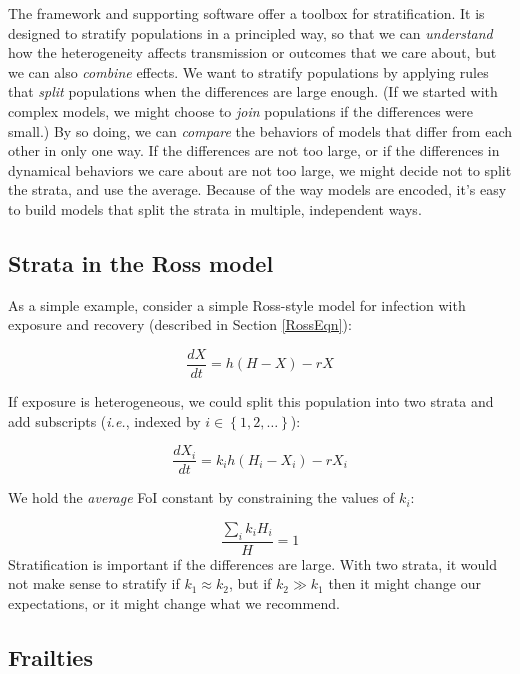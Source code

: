 \documentclass[
]{book}
\begin{document}
The framework and supporting software offer a toolbox for stratification. It is designed to stratify populations in a principled way, so that we can \emph{understand} how the heterogeneity affects transmission or outcomes that we care about, but we can also \emph{combine} effects. We want to stratify populations by applying rules that \emph{split} populations when the differences are large enough. (If we started with complex models, we might choose to \emph{join} populations if the differences were small.) By so doing, we can \emph{compare} the behaviors of models that differ from each other in only one way. If the differences are not too large, or if the differences in dynamical behaviors we care about are not too large, we might decide not to split the strata, and use the average. Because of the way models are encoded, it's easy to build models that split the strata in multiple, independent ways.

\hypertarget{strata-in-the-ross-model}{%
\subsection{Strata in the Ross model}\label{strata-in-the-ross-model}}

As a simple example, consider a simple Ross-style model for infection with exposure and recovery (described in Section \ref{RossEqn}):

\[\frac{dX}{dt} = h (H-X)-r X\]

If exposure is heterogeneous, we could split this population into two strata and add subscripts (\emph{i.e.}, indexed by \(i \in \left\{1,2, \ldots \right\}\)):

\[\frac{dX_i}{dt} =  k_i h (H_i -X_i)-r X_i\]

We hold the \emph{average} FoI constant by constraining the values of \(k_i\):

\[\frac{\sum_i k_i H_i}{H} = 1\]
Stratification is important if the differences are large. With two strata, it would not make sense to stratify if \(k_1 \approx k_2\), but if \(k_2 \gg k_1\) then it might change our expectations, or it might change what we recommend.

\hypertarget{frailties}{%
\subsection{Frailties}\label{frailties}}
\end{document}
